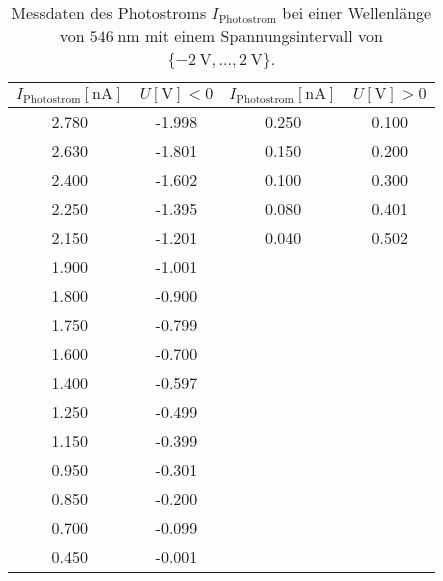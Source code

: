 \begin{table}
    \centering
    \caption{Messdaten des Photostroms $I_{\text{Photostrom}}$ bei einer Wellenlänge von $\SI{546}{\nano\meter}$ mit einem Spannungsintervall von $\{\SI{-2}{\volt},... ,\SI{2}{\volt}\}$.}
    \label{tab:tab2}
    \begin{tabular}{c c || c c}
        \toprule
        $I_{\text{Photostrom}}[\si{\nano\ampere}]$ & $U [\si{\volt}] < 0$ & $I_{\text{Photostrom}}[\si{\nano\ampere}]$ & $U [\si{\volt}] > 0$ \\
        \midrule
        2.780    &     -1.998   &  0.250        &        0.100 \\
        2.630    &     -1.801   &  0.150        &        0.200 \\        
        2.400    &     -1.602   &  0.100        &        0.300 \\
        2.250    &     -1.395   &  0.080        &        0.401 \\        
        2.150    &     -1.201   &  0.040        &        0.502 \\
        1.900    &     -1.001   &  & \\        
        1.800    &     -0.900   &  & \\
        1.750    &     -0.799   &  & \\        
        1.600    &     -0.700   &  & \\
        1.400    &     -0.597   &  & \\        
        1.250    &     -0.499   &  & \\
        1.150    &     -0.399   &  & \\        
        0.950    &     -0.301   &  & \\
        0.850    &     -0.200   &  & \\        
        0.700    &     -0.099   &  & \\
        0.450    &     -0.001   &  & \\            

       \bottomrule
    \end{tabular}
\end{table}

